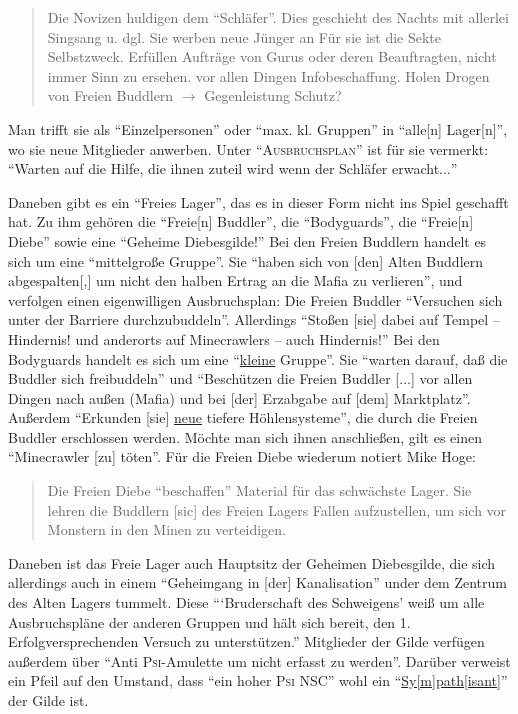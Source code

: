 \documentclass[a5paper,pagesize,numbers=noenddot]{scrbook}
\begin{document}
\begin{quote}
   Die Novizen huldigen dem \enquote{Schläfer}.
   Dies geschieht des Nachts mit allerlei Singsang u. dgl.
   Sie werben neue Jünger an
   Für sie ist die Sekte Selbstzweck.
   Erfüllen Aufträge von Gurus oder deren Beauftragten, nicht immer Sinn zu ersehen.
   vor allen Dingen Infobeschaffung.
   Holen Drogen von Freien Buddlern $\rightarrow$ Gegenleistung Schutz?
\end{quote}

Man trifft sie als \enquote{Einzelpersonen} oder \enquote{max. kl. Gruppen} in \enquote{alle[n] Lager[n]}, wo sie neue Mitglieder anwerben.
Unter \enquote{\textsc{Ausbruchsplan}} ist für sie vermerkt:
\enquote{Warten auf die Hilfe, die ihnen zuteil wird wenn der Schläfer erwacht$\ldots$}

Daneben gibt es ein \enquote{Freies Lager}, das es in dieser Form nicht ins Spiel geschafft hat.
Zu ihm gehören die \enquote{Freie[n] Buddler}, die \enquote{Bodyguards}, die \enquote{Freie[n] Diebe} sowie eine \enquote{Geheime Diebesgilde!}
Bei den Freien Buddlern handelt es sich um eine \enquote{mittelgroße Gruppe}.
Sie \enquote{haben sich von [den] Alten Buddlern abgespalten[,] um nicht den halben Ertrag an die Mafia zu verlieren}, und verfolgen einen eigenwilligen Ausbruchsplan:
Die Freien Buddler \enquote{Versuchen sich unter der Barriere durchzubuddeln}.
Allerdings \enquote{Stoßen [sie] dabei auf Tempel -- Hindernis! und anderorts auf Minecrawlers -- auch Hindernis!}
Bei den Bodyguards handelt es sich um eine \enquote{\uline{kleine} Gruppe}.
Sie \enquote{warten darauf, daß die Buddler sich freibuddeln} und \enquote{Beschützen die Freien Buddler [$\ldots$] vor allen Dingen nach außen (Mafia) und bei [der] Erzabgabe auf [dem] Marktplatz}.
Außerdem \enquote{Erkunden [sie] \uline{neue} tiefere Höhlensysteme}, die durch die Freien Buddler erschlossen werden.
Möchte man sich ihnen anschließen, gilt es einen \enquote{Minecrawler [zu] töten}.
Für die Freien Diebe wiederum notiert Mike Hoge:

\begin{quote}
   Die Freien Diebe \enquote{beschaffen} Material für das schwächste Lager.
   Sie lehren die Buddlern [sic] des Freien Lagers Fallen aufzustellen, um sich vor Monstern in den Minen zu verteidigen.
\end{quote}

Daneben ist das Freie Lager auch Hauptsitz der Geheimen Diebesgilde, die sich allerdings auch in einem \enquote{Geheimgang in [der] Kanalisation} under dem Zentrum des Alten Lagers tummelt.\autocite[S.~6]{orpheus_gildensystem}
Diese \enquote{\enquote{Bruderschaft des Schweigens} weiß um alle Ausbruchspläne der anderen Gruppen und hält sich bereit, den 1. Erfolgversprechenden Versuch zu unterstützen.}
Mitglieder der Gilde verfügen außerdem über \enquote{Anti \textsc{Psi}-Amulette um nicht erfasst zu werden}.
Darüber verweist ein Pfeil auf den Umstand, dass \enquote{ein hoher \textsc{Psi} NSC} wohl ein \enquote{\uline{Sy[m]path[isant]}} der Gilde ist.
\end{document}
